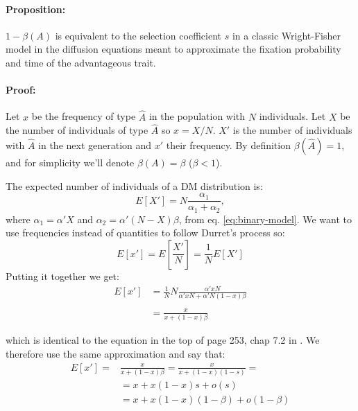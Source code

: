 \documentclass[11pt]{article}
\begin{document}
\paragraph{Proposition:} $1-\beta(A)$ is equivalent to the selection coefficient $s$ in a classic Wright-Fisher model in the diffusion equations meant to approximate the fixation probability and time of the advantageous trait.

\paragraph{Proof:} Let $x$ be the frequency of type $\hat{A}$ in the population with $N$ individuals. Let $X$ be the number of individuals of type $\hat{A}$ so $x=X/N$. $X'$ is the number of individuals with $\hat{A}$ in the next generation and $x'$ their frequency.
By definition $\beta(\hat{A})=1$, and for simplicity we'll denote $\beta(A)=\beta$ ($\beta<1$).

The expected number of individuals of a DM distribution is:
\begin{equation}
E[X'] = N  \frac{\alpha_1}{\alpha_1+\alpha_2},
\end{equation}
where $\alpha_1 = \alpha' X$ and $\alpha_2 = \alpha'(N-X)\beta$, from eq. \ref{eq:binary-model}.
We want to use frequencies instead of quantities to follow Durret's process so:
\begin{equation}
E[x'] = E[\frac{X'}{N}] = \frac{1}{N}E[X']
\end{equation}
Putting it together we get:
\begin{equation}
\begin{split}
E[x'] &= \frac{1}{N}N\frac{\alpha' xN}{\alpha' xN + \alpha' N (1-x)\beta}\\\\
	 &= \frac{x}{x + (1-x)\beta}
\end{split}
\end{equation}

which is identical to the equation in the top of page 253, chap 7.2 in \citet{durret}. We therefore use the same approximation and say that:
\begin{equation}
\begin{split}
E[x'] =& \frac{x}{x + (1-x)\beta} = \frac{x}{x + (1-x)(1-s)} =\\
 &= x + x(1-x)s + o(s)\\
  &= x + x(1-x)(1-\beta) + o(1-\beta)
\end{split}
\end{equation}
\end{document}
